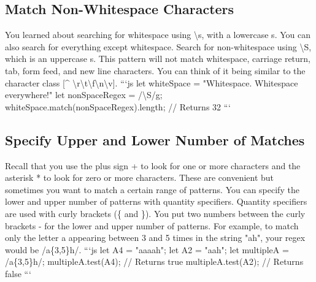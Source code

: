 \documentclass{article}%
\begin{document}
\subsection{Match Non{-}Whitespace Characters}%
\label{subsec:MatchNon{-}WhitespaceCharacters}%
You learned about searching for whitespace using \textbackslash{}s, with a lowercase s. You can also search for everything except whitespace.\newline%
Search for non{-}whitespace using \textbackslash{}S, which is an uppercase s. This pattern will not match whitespace, carriage return, tab, form feed, and new line characters. You can think of it being similar to the character class {[}\^{} \textbackslash{}r\textbackslash{}t\textbackslash{}f\textbackslash{}n\textbackslash{}v{]}.\newline%
```js\newline%
let whiteSpace = "Whitespace. Whitespace everywhere!"\newline%
let nonSpaceRegex = /\textbackslash{}S/g;\newline%
whiteSpace.match(nonSpaceRegex).length; // Returns 32\newline%
```\newline%

%
\subsection{Specify Upper and Lower Number of Matches}%
\label{subsec:SpecifyUpperandLowerNumberofMatches}%
Recall that you use the plus sign + to look for one or more characters and the asterisk * to look for zero or more characters. These are convenient but sometimes you want to match a certain range of patterns.\newline%
You can specify the lower and upper number of patterns with quantity specifiers. Quantity specifiers are used with curly brackets (\{ and \}). You put two numbers between the curly brackets {-} for the lower and upper number of patterns.\newline%
For example, to match only the letter a appearing between 3 and 5 times in the string "ah", your regex would be /a\{3,5\}h/.\newline%
```js\newline%
let A4 = "aaaah";\newline%
let A2 = "aah";\newline%
let multipleA = /a\{3,5\}h/;\newline%
multipleA.test(A4); // Returns true\newline%
multipleA.test(A2); // Returns false\newline%
```\newline%
\end{document}
